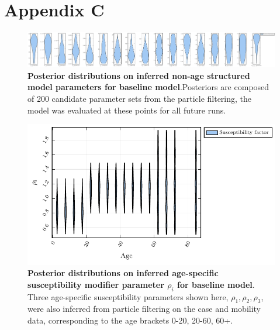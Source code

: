 \chapter{Appendix C}
\label{appendix_c}

\begin{figure}[H]
\centering
\includegraphics[width = 18 cm]{appendices/FigureS1.pdf}
\caption{\textbf{Posterior distributions on inferred non-age structured model parameters for baseline model}.Posteriors are composed of 200 candidate parameter sets from the particle filtering, the model was evaluated at these points for all future runs.}
\label{plot_model}
\end{figure}

\begin{figure}[H]
    \centering
    \includegraphics[width = 12 cm]{appendices/FigureS2.pdf}
    \caption{\textbf{Posterior distributions on inferred age-specific susceptibility modifier parameter $\rho_i$ for baseline model}. Three age-specific susceptibility parameters shown here, $\rho_1,\rho_2,\rho_3$, were also inferred from particle filtering on the case and mobility data, corresponding to the age brackets 0-20, 20-60, 60+.}
    \label{plot_model}
    \end{figure}
    
    \clearpage 
    
